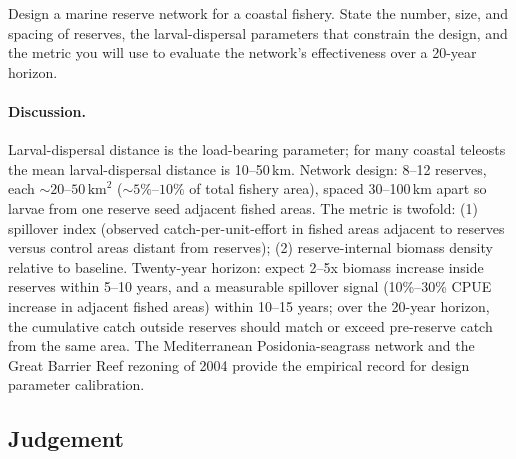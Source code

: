 \begin{exercise}
Design a marine reserve network for a coastal fishery. State the
number, size, and spacing of reserves, the larval-dispersal
parameters that constrain the design, and the metric you will use
to evaluate the network's effectiveness over a 20-year horizon.

\paragraph{Discussion.} Larval-dispersal distance is the load-bearing
parameter; for many coastal teleosts the mean larval-dispersal
distance is 10--50\,km. Network design: 8--12 reserves, each
$\sim 20$--$50\,\text{km}^2$ ($\sim 5\%$--$10\%$ of total fishery
area), spaced 30--100\,km apart so larvae from one reserve seed
adjacent fished areas. The metric is twofold: (1) spillover index
(observed catch-per-unit-effort in fished areas adjacent to
reserves versus control areas distant from reserves); (2)
reserve-internal biomass density relative to baseline. Twenty-year
horizon: expect 2--5x biomass increase inside reserves within
5--10 years, and a measurable spillover signal (10\%--30\% CPUE
increase in adjacent fished areas) within 10--15 years; over the
20-year horizon, the cumulative catch outside reserves should
match or exceed pre-reserve catch from the same area. The
Mediterranean Posidonia-seagrass network and the Great Barrier
Reef rezoning of 2004 provide the empirical record for design
parameter calibration.
\end{exercise}

\subsection*{Judgement}


